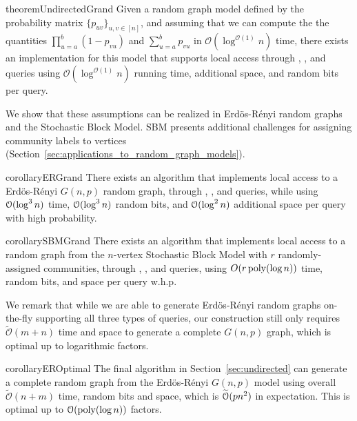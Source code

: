 \begin{restatable}{theorem}{UndirectedGrand}
\label{thm:grand}
Given a random graph model defined by the probability matrix $\{ p_{uv}\}_{u,v\in [n]}$,
and assuming that we can compute the the quantities $\prod_{u=a}^b (1-p_{vu})$ and $\sum_{u=a}^b p_{vu}$ in $\mathcal O(\log^{\mathcal O(1)} n)$ time,
there exists an implementation for this model that supports local access through , ,
and  queries using $\mathcal O(\log^{\mathcal O(1)} n)$ running time, additional space, and random bits per query.
\end{restatable}

We show that these assumptions can be realized in Erd\"os-R\'enyi random graphs and the Stochastic Block Model.
SBM presents additional challenges for assigning community labels to vertices (Section~\ref{sec:applications_to_random_graph_models}).

\begin{restatable}{corollary}{ERGrand}
There exists an algorithm that implements local access to a Erd\"{o}s-R\'{e}nyi $G(n,p)$ random graph,
through , , and  queries,
while using $\mathcal{O}(\log^3 n)$ time, $\mathcal{O}(\log^3 n)$ random bits, and $\mathcal{O}(\log^2 n)$ additional space per query with high probability.
\end{restatable}

\begin{restatable}{corollary}{SBMGrand}\label{cor:sbm-construct}
There exists an algorithm that implements local access to a random graph from the $n$-vertex Stochastic Block Model
with $r$ randomly-assigned communities,
through , , and  queries,
using $O(r\,\mathrm{poly}(\log n))$ time, random bits, and space per query w.h.p.
\end{restatable}

We remark that while we are able to generate Erd\"{o}s-R\'{e}nyi random graphs on-the-fly supporting all three types of queries,
our construction still only requires $\widetilde{\mathcal O}(m+n)$ time and space to generate a complete $G(n,p)$ graph,
which is optimal up to logarithmic factors.

\begin{restatable}{corollary}{EROptimal}
\label{thm:er-optimal}
The final algorithm in Section~\ref{sec:undirected} can generate a complete random graph
from the Erd\"{o}s-R\'{e}nyi $G(n,p)$ model using overall
$\widetilde{\mathcal{O}}(n+m)$ time, random bits and space, which is $\widetilde{\mathcal{O}}(pn^2)$ in expectation.
This is optimal up to $ \mathcal{O}(\mathrm{poly}(\log n))$ factors.
\end{restatable}




